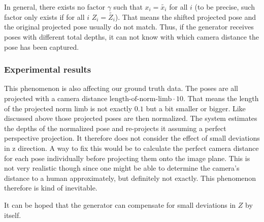In general, there exists no factor $\gamma$ such that $x_i = \widetilde{x_i}$ for all $i$ (to be precise, such factor only exists if for all $i$ $Z_i = \widetilde{Z_i}$).
That means the shifted projected pose and the original projected pose usually do not match.
Thus, if the generator receives poses with different total depths, it can not know with which camera distance the pose has been captured.


\subsubsection{Experimental results}
\label{sec:error-on-shift-experimental}

This phenomenon is also affecting our ground truth data. The poses are all projected with a camera distance $ \text{length-of-norm-limb} \cdot 10$. 
That means the length of the projected norm limb is not exactly $0.1$ but a bit smaller or bigger. 
Like discussed above those projected poses are then normalized. 
The system estimates the depths of the normalized pose and re-projects it assuming a perfect perspective projection. 
It therefore does not consider the effect of small deviations in z direction.
A way to fix this would be to calculate the perfect camera distance for each pose individually before projecting them onto the image plane.
This is not very realistic though since one might be able to determine the camera's distance to a human approximately, but definitely not exactly. This phenomenon therefore is kind of inevitable.

It can be hoped that the generator can compensate for small deviations in $Z$ by itself.

